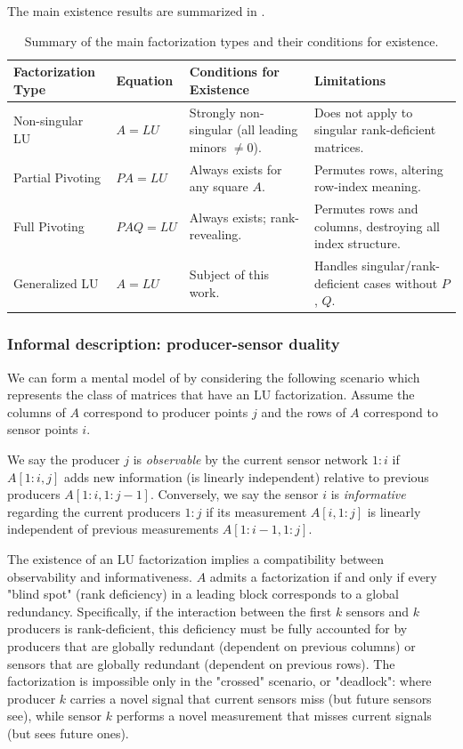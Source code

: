 \documentclass[10pt,twoside]{siamart1116}
\numberwithin{theorem}{section}
\providecommand{\DIFadd}[1]{{\protect\color{blue} \sf #1}} %
\providecommand{\DIFdel}[1]{{\protect\color{red} \scriptsize #1}} %
\providecommand{\DIFaddFL}[1]{\DIFadd{#1}} %
\providecommand{\DIFdelFL}[1]{\DIFdel{#1}} %
\providecommand{\DIFaddbeginFL}{} %
\providecommand{\DIFaddendFL}{} %
\providecommand{\DIFdelbeginFL}{} %
\providecommand{\DIFdelendFL}{} %
\begin{document}
The main existence results are summarized in .

\begin{table}[htbp]
  \centering
  \begin{tabular}{llp{4cm}p{6cm}}
    \toprule
    Factorization Type & Equation & Conditions for Existence & Limitations \\
    \midrule
    Non-singular LU & $A=LU$ & Strongly non-singular (all leading minors $\neq 0$). & Does not apply to \DIFdelbeginFL \DIFdelFL{singular }\DIFdelendFL \DIFaddbeginFL \DIFaddFL{rank-deficient }\DIFaddendFL matrices. \\
    Partial Pivoting & $PA=LU$ & \raggedright Always exists for any square $A$. & \raggedright Permutes rows, altering row-index meaning.\tabularnewline
    Full Pivoting & $PAQ=LU$ & \raggedright Always exists; rank-revealing. & \raggedright Permutes rows and columns, destroying all index structure.\tabularnewline
    Generalized LU & $A=LU$ & Subject of this work. & \raggedright Handles \DIFdelbeginFL \DIFdelFL{singular/}\DIFdelendFL rank-deficient cases without $P$, $Q$.\tabularnewline
    \bottomrule
  \end{tabular}
  \caption{Summary of the main factorization types and their conditions for existence.}\label{tab:main}
\end{table}

\subsubsection*{Informal description: producer-sensor duality}

We can form a mental model of  by considering the following scenario which represents the class of matrices that have an LU factorization. Assume the columns of $A$ correspond to producer points $j$ and the rows of $A$ correspond to sensor points $i$.

We say the producer $j$ is \emph{observable} by the current sensor network $1:i$ if $A[1:i,j]$ adds new information (is linearly independent) relative to previous producers $A[1:i,1:j-1]$. Conversely, we say the sensor $i$ is \emph{informative} regarding the current producers $1:j$ if its measurement $A[i,1:j]$ is linearly independent of previous measurements $A[1:i-1,1:j]$.

The existence of an LU factorization implies a compatibility between observability and informativeness. $A$ admits a factorization if and only if every "blind spot" (rank deficiency) in a leading block corresponds to a global redundancy. Specifically, if the interaction between the first $k$ sensors and $k$ producers is rank-deficient, this deficiency must be fully accounted for by producers that are globally redundant (dependent on previous columns) or sensors that are globally redundant (dependent on previous rows). The factorization is impossible only in the "crossed" scenario, or "deadlock": where producer $k$ carries a novel signal that current sensors miss (but future sensors see), while sensor $k$ performs a novel measurement that misses current signals (but sees future ones).
\end{document}
